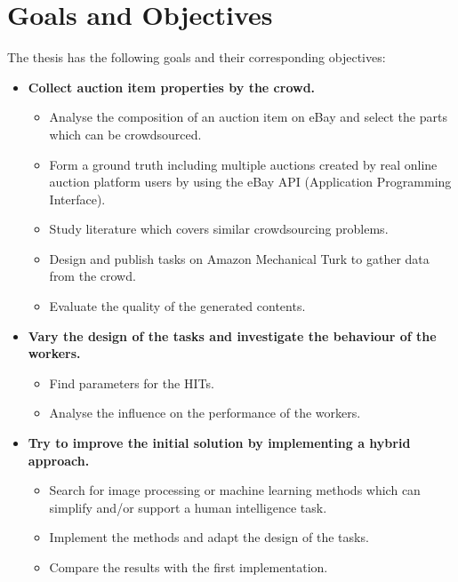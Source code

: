\documentclass[a4paper]{report}
\begin{document}
\section{Goals and Objectives}
The thesis has the following goals and their corresponding objectives:
\begin{itemize}
	\item \textbf{Collect auction item properties by the crowd.}
	\begin{itemize}
		\item Analyse the composition of an auction item on eBay and select the parts which can be crowdsourced.
		\item Form a ground truth including multiple auctions created by real online auction platform users by using the eBay API (Application Programming Interface).
		\item Study literature which covers similar crowdsourcing problems.
		\item Design and publish tasks on Amazon Mechanical Turk to gather data from the crowd.
		\item Evaluate the quality of the generated contents.
	\end{itemize}
	\item \textbf{Vary the design of the tasks and investigate the behaviour of the workers.}
	\begin{itemize}
		\item Find parameters for the HITs.
		\item Analyse the influence on the performance of the workers.
	\end{itemize}
	\item \textbf{Try to improve the initial solution by implementing a hybrid approach.}
	\begin{itemize}
		\item Search for image processing or machine learning methods which can simplify and/or support a human intelligence task.
		\item Implement the methods and adapt the design of the tasks.
		\item Compare the results with the first implementation.		
	\end{itemize}
\end{itemize}
\end{document}
